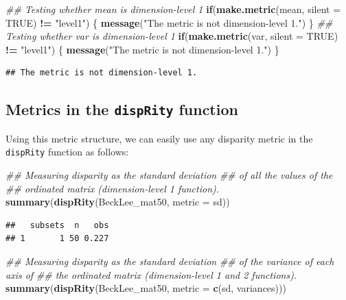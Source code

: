 \documentclass[]{book}
\newenvironment{Shaded}{\begin{snugshade}}{\end{snugshade}}
\newcommand{\CommentTok}[1]{\textcolor[rgb]{0.56,0.35,0.01}{\textit{#1}}}
\newcommand{\ControlFlowTok}[1]{\textcolor[rgb]{0.13,0.29,0.53}{\textbf{#1}}}
\newcommand{\DataTypeTok}[1]{\textcolor[rgb]{0.13,0.29,0.53}{#1}}
\newcommand{\KeywordTok}[1]{\textcolor[rgb]{0.13,0.29,0.53}{\textbf{#1}}}
\newcommand{\NormalTok}[1]{#1}
\newcommand{\OperatorTok}[1]{\textcolor[rgb]{0.81,0.36,0.00}{\textbf{#1}}}
\newcommand{\OtherTok}[1]{\textcolor[rgb]{0.56,0.35,0.01}{#1}}
\newcommand{\StringTok}[1]{\textcolor[rgb]{0.31,0.60,0.02}{#1}}
\begin{document}
\begin{Shaded}
\begin{Highlighting}[]
\CommentTok{## Testing whether mean is dimension-level 1}
\ControlFlowTok{if}\NormalTok{(}\KeywordTok{make.metric}\NormalTok{(mean, }\DataTypeTok{silent =} \OtherTok{TRUE}\NormalTok{) }\OperatorTok{!=}\StringTok{ "level1"}\NormalTok{) \{}
    \KeywordTok{message}\NormalTok{(}\StringTok{"The metric is not dimension-level 1."}\NormalTok{)}
\NormalTok{\}}
\CommentTok{## Testing whether var is dimension-level 1}
\ControlFlowTok{if}\NormalTok{(}\KeywordTok{make.metric}\NormalTok{(var, }\DataTypeTok{silent =} \OtherTok{TRUE}\NormalTok{) }\OperatorTok{!=}\StringTok{ "level1"}\NormalTok{) \{}
    \KeywordTok{message}\NormalTok{(}\StringTok{"The metric is not dimension-level 1."}\NormalTok{)}
\NormalTok{\}}
\end{Highlighting}
\end{Shaded}

\begin{verbatim}
## The metric is not dimension-level 1.
\end{verbatim}

\hypertarget{metrics-in-the-disprity-function}{%
\subsection{\texorpdfstring{Metrics in the \texttt{dispRity} function}{Metrics in the dispRity function}}\label{metrics-in-the-disprity-function}}

Using this metric structure, we can easily use any disparity metric in the \texttt{dispRity} function as follows:

\begin{Shaded}
\begin{Highlighting}[]
\CommentTok{## Measuring disparity as the standard deviation}
\CommentTok{## of all the values of the}
\CommentTok{## ordinated matrix (dimension-level 1 function).}
\KeywordTok{summary}\NormalTok{(}\KeywordTok{dispRity}\NormalTok{(BeckLee_mat50, }\DataTypeTok{metric =}\NormalTok{ sd))}
\end{Highlighting}
\end{Shaded}

\begin{verbatim}
##   subsets  n   obs
## 1       1 50 0.227
\end{verbatim}

\begin{Shaded}
\begin{Highlighting}[]
\CommentTok{## Measuring disparity as the standard deviation}
\CommentTok{## of the variance of each axis of}
\CommentTok{## the ordinated matrix (dimension-level 1 and 2 functions).}
\KeywordTok{summary}\NormalTok{(}\KeywordTok{dispRity}\NormalTok{(BeckLee_mat50, }\DataTypeTok{metric =} \KeywordTok{c}\NormalTok{(sd, variances)))}
\end{Highlighting}
\end{Shaded}
\end{document}
